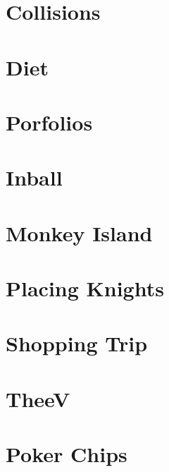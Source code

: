 \documentclass[a4paper, 10pt]{article}
\let\stdsection\section
\renewcommand\section{\newpage\stdsection}
\newcommand{\includecode}[1]{
    }
\begin{document}
    \section{Collisions}
        \includecode{../problems/w08/Collisions/Collisions1.cpp}
        
    \section{Diet}
        \includecode{../problems/w08/Diet/Diet1.cpp}
        
    \section{Porfolios}
        \includecode{../problems/w08/Portfolios/Portfolios1.cpp}
    
    \section{Inball}
        \includecode{../problems/w08/Inball/Inball1.cpp}
    
    
    \section{Monkey Island}
        \includecode{../problems/w09/MonkeyIsland/MonkeyIsland1.cpp}
        
    \section{Placing Knights}
        \includecode{../problems/w09/Placing_Knights/PlacingKnights1.cpp}
        
    \section{Shopping Trip}
        \includecode{../problems/w09/Shopping_Trip/ShoppingTrip1.cpp}
        
    \section{TheeV}
        \includecode{../problems/w09/TheeV/TheeV1.cpp}
   
    
    \section{Poker Chips}
        \includecode{../problems/w10/Poker_Chips/PokerChips1.cpp}
        
\end{document}
